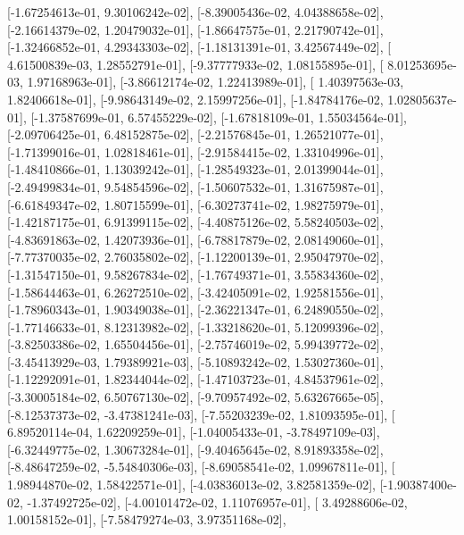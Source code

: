 \documentclass{article}
\begin{document}
       [-1.67254613e-01,  9.30106242e-02],
       [-8.39005436e-02,  4.04388658e-02],
       [-2.16614379e-02,  1.20479032e-01],
       [-1.86647575e-01,  2.21790742e-01],
       [-1.32466852e-01,  4.29343303e-02],
       [-1.18131391e-01,  3.42567449e-02],
       [ 4.61500839e-03,  1.28552791e-01],
       [-9.37777933e-02,  1.08155895e-01],
       [ 8.01253695e-03,  1.97168963e-01],
       [-3.86612174e-02,  1.22413989e-01],
       [ 1.40397563e-03,  1.82406618e-01],
       [-9.98643149e-02,  2.15997256e-01],
       [-1.84784176e-02,  1.02805637e-01],
       [-1.37587699e-01,  6.57455229e-02],
       [-1.67818109e-01,  1.55034564e-01],
       [-2.09706425e-01,  6.48152875e-02],
       [-2.21576845e-01,  1.26521077e-01],
       [-1.71399016e-01,  1.02818461e-01],
       [-2.91584415e-02,  1.33104996e-01],
       [-1.48410866e-01,  1.13039242e-01],
       [-1.28549323e-01,  2.01399044e-01],
       [-2.49499834e-01,  9.54854596e-02],
       [-1.50607532e-01,  1.31675987e-01],
       [-6.61849347e-02,  1.80715599e-01],
       [-6.30273741e-02,  1.98275979e-01],
       [-1.42187175e-01,  6.91399115e-02],
       [-4.40875126e-02,  5.58240503e-02],
       [-4.83691863e-02,  1.42073936e-01],
       [-6.78817879e-02,  2.08149060e-01],
       [-7.77370035e-02,  2.76035802e-02],
       [-1.12200139e-01,  2.95047970e-02],
       [-1.31547150e-01,  9.58267834e-02],
       [-1.76749371e-01,  3.55834360e-02],
       [-1.58644463e-01,  6.26272510e-02],
       [-3.42405091e-02,  1.92581556e-01],
       [-1.78960343e-01,  1.90349038e-01],
       [-2.36221347e-01,  6.24890550e-02],
       [-1.77146633e-01,  8.12313982e-02],
       [-1.33218620e-01,  5.12099396e-02],
       [-3.82503386e-02,  1.65504456e-01],
       [-2.75746019e-02,  5.99439772e-02],
       [-3.45413929e-03,  1.79389921e-03],
       [-5.10893242e-02,  1.53027360e-01],
       [-1.12292091e-01,  1.82344044e-02],
       [-1.47103723e-01,  4.84537961e-02],
       [-3.30005184e-02,  6.50767130e-02],
       [-9.70957492e-02,  5.63267665e-05],
       [-8.12537373e-02, -3.47381241e-03],
       [-7.55203239e-02,  1.81093595e-01],
       [ 6.89520114e-04,  1.62209259e-01],
       [-1.04005433e-01, -3.78497109e-03],
       [-6.32449775e-02,  1.30673284e-01],
       [-9.40465645e-02,  8.91893358e-02],
       [-8.48647259e-02, -5.54840306e-03],
       [-8.69058541e-02,  1.09967811e-01],
       [ 1.98944870e-02,  1.58422571e-01],
       [-4.03836013e-02,  3.82581359e-02],
       [-1.90387400e-02, -1.37492725e-02],
       [-4.00101472e-02,  1.11076957e-01],
       [ 3.49288606e-02,  1.00158152e-01],
       [-7.58479274e-03,  3.97351168e-02],
\end{document}
